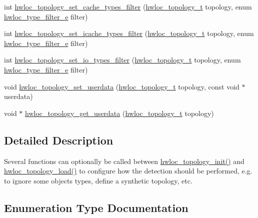 \begin{DoxyCompactItemize}
int \hyperlink{a00193_ga30bd6d330fe3c8f0cbaad724d114ee20}{hwloc\+\_\+topology\+\_\+set\+\_\+cache\+\_\+types\+\_\+filter} (\hyperlink{a00186_ga9d1e76ee15a7dee158b786c30b6a6e38}{hwloc\+\_\+topology\+\_\+t} topology, enum \hyperlink{a00193_ga9a5a1f0140cd1952544477833733195b}{hwloc\+\_\+type\+\_\+filter\+\_\+e} filter)
\item 
int \hyperlink{a00193_ga37c7b2e599ed3cd76ad9164630024f30}{hwloc\+\_\+topology\+\_\+set\+\_\+icache\+\_\+types\+\_\+filter} (\hyperlink{a00186_ga9d1e76ee15a7dee158b786c30b6a6e38}{hwloc\+\_\+topology\+\_\+t} topology, enum \hyperlink{a00193_ga9a5a1f0140cd1952544477833733195b}{hwloc\+\_\+type\+\_\+filter\+\_\+e} filter)
\item 
int \hyperlink{a00193_ga0ab38705357bc1203abe829da8a12ad3}{hwloc\+\_\+topology\+\_\+set\+\_\+io\+\_\+types\+\_\+filter} (\hyperlink{a00186_ga9d1e76ee15a7dee158b786c30b6a6e38}{hwloc\+\_\+topology\+\_\+t} topology, enum \hyperlink{a00193_ga9a5a1f0140cd1952544477833733195b}{hwloc\+\_\+type\+\_\+filter\+\_\+e} filter)
\item 
void \hyperlink{a00193_ga2cc7b7b155cba58dda203e54f1637b9c}{hwloc\+\_\+topology\+\_\+set\+\_\+userdata} (\hyperlink{a00186_ga9d1e76ee15a7dee158b786c30b6a6e38}{hwloc\+\_\+topology\+\_\+t} topology, const void $\ast$userdata)
\item 
void $\ast$ \hyperlink{a00193_ga91f992f8d6c4905b2d3c4f43e509c2a3}{hwloc\+\_\+topology\+\_\+get\+\_\+userdata} (\hyperlink{a00186_ga9d1e76ee15a7dee158b786c30b6a6e38}{hwloc\+\_\+topology\+\_\+t} topology)
\end{DoxyCompactItemize}


\subsection{Detailed Description}
Several functions can optionally be called between \hyperlink{a00186_ga03fd4a16d8b9ee1ffc32b25fd2f6bdfa}{hwloc\+\_\+topology\+\_\+init()} and \hyperlink{a00186_gabdf58d87ad77f6615fccdfe0535ff826}{hwloc\+\_\+topology\+\_\+load()} to configure how the detection should be performed, e.\+g. to ignore some objects types, define a synthetic topology, etc. 

\subsection{Enumeration Type Documentation}
\mbox{\label{a00193_gada025d3ec20b4b420f8038d23d6e7bde}} 
